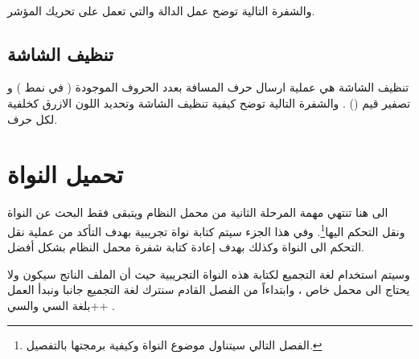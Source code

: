 \documentclass[document.tex]{subfiles}
\begin{document}
\begin{english}
\\
\end{english}

والشفرة التالية توضح عمل الدالة  والتي تعمل على تحريك المؤشر.

\begin{english}
\lstset{numberstyle=\tiny,numbers=left,stepnumber=1,numbersep=5pt,tabsize=2,extendedchars=true,breaklines=true,frame=b,showspaces=false, showtabs=false,xleftmargin=10pt,framexleftmargin=10pt,framexrightmargin=5pt,framexbottommargin=4pt,showstringspaces=false,language=[x86masm]Assembler}


\end{english}

\subsection{تنظيف الشاشة }
تنظيف الشاشة هي عملية ارسال حرف المسافة بعدد الحروف الموجودة ( في نمط ) و تصفير قيم () . والشفرة التالية توضح كيفية تنظيف الشاشة وتحديد اللون الازرق كخلفية لكل حرف.

\begin{english}
\lstset{numberstyle=\tiny,numbers=left,stepnumber=1,numbersep=5pt,tabsize=2,extendedchars=true,breaklines=true,frame=b,showspaces=false, showtabs=false,xleftmargin=10pt,framexleftmargin=10pt,framexrightmargin=5pt,framexbottommargin=4pt,showstringspaces=false,language=[x86masm]Assembler}


\end{english}

\section{تحميل النواة}
الى هنا تنتهي مهمة المرحلة الثانية من محمل النظام  ويتبقى فقط البحث عن النواة ونقل التحكم اليها\footnote{الفصل التالي سيتناول موضوع النواة وكيفية برمجتها بالتفصيل.}. وفي هذا الجزء سيتم كتابة نواة تجريبية بهدف التأكد من عملية نقل التحكم الى النواة وكذلك بهدف إعادة كتابة شفرة محمل النظام بشكل أفضل.

وسيتم استخدام لغة التجميع لكتابة هذه النواة التجريبية حيث أن الملف الناتج سيكون  ولا يحتاج الى محمل خاص ، وابتداءاً من الفصل القادم سنترك لغة التجميع جانبا ونبدأ العمل بلغة السي والسي++ .
\end{document}
